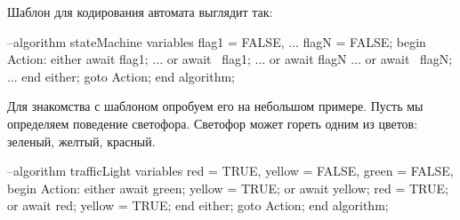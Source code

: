 \documentclass[14pt, openany]{report}
\begin{document}
Шаблон для кодирования автомата выглядит так:

\begin{ppcal}
  --algorithm stateMachine
  variables
    flag1 = FALSE,
    ...
    flagN = FALSE;
  begin
    Action:
      either
        await flag1;
        ...
      or 
        await ~flag1;
        ...
      or 
        await flagN
        ...
      or
        await ~flagN;
        ...
      end either;
    goto Action;
  end algorithm;
\end{ppcal}
\begin{tlatex}
%
%
%
%
%
%
%
%
%
%
%
%
%
%
%
%
%
%
%
%
%
%
\end{tlatex}

Для знакомства с шаблоном опробуем его на небольшом примере. Пусть мы определяем поведение светофора. Светофор может гореть одним из цветов: зеленый, желтый, красный. 

\begin{ppcal}
  --algorithm trafficLight
  variables
    red = TRUE,
    yellow = FALSE,
    green = FALSE,
  begin
    Action:
      either
        await green;
        yellow = TRUE;
      or 
        await yellow;
        red = TRUE;
      or 
        await red;
        yellow = TRUE;
      end either;
    goto Action;
  end algorithm;
\end{ppcal}
\begin{tlatex}
%
%
%
%
%
%
%
%
%
%
%
%
%
%
%
%
%
%
%
\end{tlatex}
\end{document}
